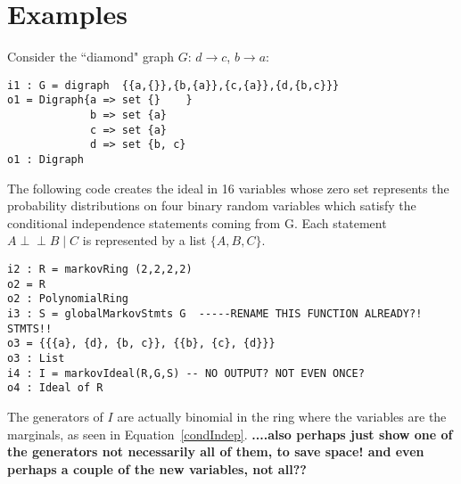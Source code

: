 \documentclass{article}
\theoremstyle{definition}
\def\ci{\perp\!\!\!\perp}
\begin{document}

       
\section{Examples}

 
Consider the ``diamond" graph $G$: $d \rightarrow c$, $b \rightarrow a$:
\begin{verbatim}
i1 : G = digraph  {{a,{}},{b,{a}},{c,{a}},{d,{b,c}}}
o1 = Digraph{a => set {}    }
             b => set {a}
             c => set {a}
             d => set {b, c}
o1 : Digraph
\end{verbatim}
The following code creates the ideal in 16 variables whose zero set represents the probability distributions on
four binary random variables which satisfy the conditional independence statements coming from G. Each statement $A \ci B \mid C$ is represented by a list $\{A,B,C\}$. 
\begin{verbatim}
i2 : R = markovRing (2,2,2,2)
o2 = R
o2 : PolynomialRing
i3 : S = globalMarkovStmts G  -----RENAME THIS FUNCTION ALREADY?! STMTS!!
o3 = {{{a}, {d}, {b, c}}, {{b}, {c}, {d}}}
o3 : List
i4 : I = markovIdeal(R,G,S) -- NO OUTPUT? NOT EVEN ONCE? 
o4 : Ideal of R
\end{verbatim}
The generators of $I$ are actually binomial in the ring where the variables are the marginals, as seen in Equation~\eqref{condIndep}. {\bf ....also perhaps just show one of the generators not necessarily all of them, to save space! and even perhaps a couple of the new variables, not all??}
\end{document}
